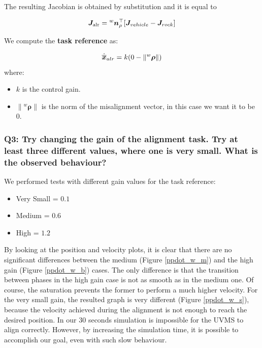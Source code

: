 \documentclass{article}
\begin{document}
The resulting Jacobian is obtained by substitution and it is equal to 

\begin{equation}
\large
\boldsymbol J_{\text {alr}}={^w}{\boldsymbol n_{\rho}^\top}[{ \boldsymbol J_{vehicle} - \boldsymbol J_{rock}}]
\end{equation}

We compute the \textbf{task reference} as:

\begin{equation}
\large
    \dot{\overline{\boldsymbol{x}}}_{alr} = k( 0 - \left\| ^w \boldsymbol \rho \right\|) %
\end{equation}
where:
\begin{itemize}
    \item $k$ is the control gain.
    \item $\left\| ^w \boldsymbol \rho \right\|$ is the norm of the misalignment vector, in this case we want it to be $0$.
\end{itemize} 


\subsubsection{Q3: Try changing the gain of the alignment task. Try at least three different values, where one is very small. What is the observed behaviour?} 
We performed tests with different gain values for the task reference:
\begin{itemize}
 \item Very Small = $0.1$
 \item Medium = $0.6$
 \item High = $1.2$
\end{itemize}
By looking at the position and velocity plots, it is clear that there are no significant differences between the medium (Figure \ref{ppdot_w_m}) and the high gain (Figure \ref{ppdot_w_b}) cases. The only difference is that the transition between phases in the high gain case is not as smooth as in the medium one. Of course, the saturation prevents the former to perform a much higher velocity. 
For the very small gain, the resulted graph is very different (Figure \ref{ppdot_w_s}), because the velocity achieved during the alignment is not enough to reach the desired position. In our 30 seconds simulation is impossible for the UVMS to align correctly. However, by increasing the simulation time, it is possible to accomplish our goal, even with such slow behaviour.
\end{document}

